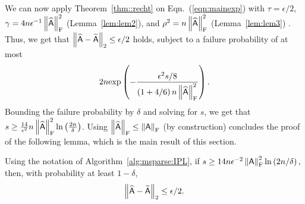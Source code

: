 \noindent We can now apply Theorem~\ref{thm::recht} on Eqn.~(\ref{eqn:mainexp}) with $\tau = \epsilon/2$, $\gamma = 4n\epsilon^{-1}\left\|\widehat{{\mathsf{A} }}\right\|_{\textrm{F}}^2$ (Lemma~\ref{lem:lem2}), and $\rho^2 = n\left\|\widehat{{\mathsf{A} }}\right\|_{\textrm{F}}^2$ (Lemma~\ref{lem:lem3}) . Thus, we get that $\left\|\widehat{{\mathsf{A} }} - \widetilde{{\mathsf{A} }}\right\|_2 \leq \epsilon/2$ holds, subject to a failure probability of at most $$2n \hbox{\textrm exp}\left(-\frac{\epsilon^2 s/8}{\left(1+4/6\right)n\left\|\widehat{{\mathsf{A} }}\right\|_{\textrm{F}}^2}\right).$$
%
Bounding the failure probability by  $\delta$ and solving for $s$, we get that $s \geq \frac{14}{\epsilon^2}n\left\|\widehat{{\mathsf{A} }}\right\|_{\textrm{F}}^2 \ln\left(\frac{2n}{\delta}\right)$. Using $\left\|\widehat{{\mathsf{A} }}\right\|_{\textrm{F}} \leq \left\|{\mathsf{A} }\right\|_{\textrm{F}}$ (by construction) concludes the proof of the following lemma, which is the main result of this section.
%
\begin{lemma}\label{lem:lem4}
%
Using the notation of Algorithm~\ref{alg:msparse:IPL}, if
%
$s \geq 14n\epsilon^{-2} \left\|{\mathsf{A} }\right\|_{\textrm{F}}^2\ln\left(2n/\delta\right),$
%
then, with probability at least $1-\delta$, $$\left\|\widehat{{\mathsf{A} }} - \widetilde{{\mathsf{A} }}\right\|_2 \leq \epsilon/2.$$
%
\end{lemma}
%
%
